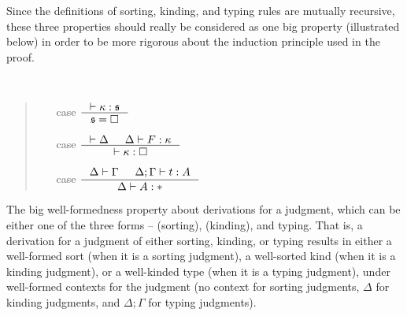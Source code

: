 Since the definitions of sorting, kinding, and typing rules are
mutually recursive, these three properties should really be considered as
one big property (illustrated below) in order to be more rigorous about
the induction principle used in the proof.
\begin{proposition*}~
\begin{quote}
\begin{itemize}
\item[case] \fbox{$ |- \kappa : \square $}\qquad\quad
 $ \inference{ |- \kappa : \mathfrak{s} }{ \mathfrak{s}=\square } $
 \qquad\qquad\qquad~~  \\
\item[case] \qquad\quad
 $ \inference{ |- \Delta & \Delta |- F : \kappa}{ |- \kappa:\square } $
 \qquad {}\\
\item[case] \quad
 $ \inference{ \Delta |- \Gamma & \Delta;\Gamma |- t : A}{ \Delta |- A : * } $
 \qquad {}\\
\end{itemize}
\end{quote}
\end{proposition*}\noindent
The big well-formedness property about derivations for a judgment,
which can be either one of the three forms --
\fbox{$ |- \kappa : \square $} (sorting),
 (kinding), and
 typing.
That is, a derivation for a judgment of either sorting, kinding, or typing
results in either a well-formed sort (when it is a sorting judgment),
a well-sorted kind (when it is a kinding judgment), or
a well-kinded type (when it is a typing judgment),
under well-formed contexts for the judgment (no context for sorting judgments,
$\Delta$ for kinding judgments, and $\Delta;\Gamma$ for typing judgments).

